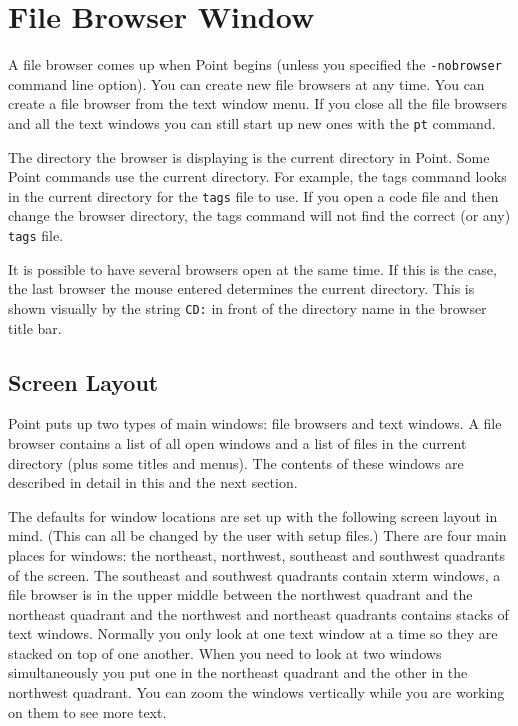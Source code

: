 \section{File Browser Window} \label{sect:browser}

A file browser comes up when Point begins
(unless you specified the {\tt -nobrowser} command line option).
You can create new file browsers at any time.
You can create a file browser from the text window menu.
If you close all the file browsers and all the text windows
you can still start up new ones with the {\tt pt} command.

The directory the browser is displaying is the current directory in Point.
Some Point commands use the current directory.
For example, the tags command looks in the current directory for
the {\tt tags} file to use.
If you open a code file and then change the browser directory,
the tags command will not find the correct (or any) {\tt tags} file.

It is possible to have several browsers open at the same time.
If this is the case, the last browser the mouse entered determines
the current directory.
This is shown visually by the string {\tt CD:} in front of the directory
name in the browser title bar.



\subsection{Screen Layout}

Point puts up two types of main windows: file browsers and text windows.
A file browser contains a list of all open windows and a list of
files in the current directory (plus some titles and menus).
The contents of these windows are described in detail in this and the
next section.

The defaults for window locations are set up with the following
screen layout in mind.
(This can all be changed by the user with setup files.)
There are four main places for windows:
the northeast, northwest, southeast and southwest quadrants of the screen.
The southeast and southwest quadrants contain xterm windows,
a file browser is in the upper middle between the northwest quadrant and the
northeast quadrant
and the northwest and northeast quadrants contains stacks of text windows.
Normally you only look at one text window at a time so they are
stacked on top of one another.
When you need to look at two windows simultaneously you put one
in the northeast quadrant and the other in the northwest quadrant.
You can zoom the windows vertically while you are working on
them to see more text.



